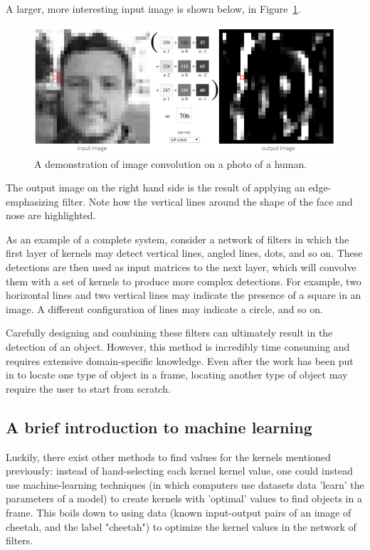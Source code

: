A larger, more interesting input image is shown below, in Figure~\ref{fig:image_kernel_demo}.

\begin{figure}[h!]
  \centering
  \includegraphics[width=\textwidth]{literature_review/image_kernel_demo}
  \caption{\label{fig:image_kernel_demo} A demonstration of image convolution on a photo of a human.}
\end{figure}

The output image on the right hand side is the result of applying an edge-emphasizing filter. Note how the vertical lines around the shape of the face and nose are highlighted.

As an example of a complete system, consider a network of filters in which the first layer of kernels may detect vertical lines, angled lines, dots, and so on. These detections are then used as input matrices to the next layer, which will convolve them with a set of kernels to produce more complex detections. For example, two horizontal lines and two vertical lines may indicate the presence of a square in an image. A different configuration of lines may indicate a circle, and so on.

Carefully designing and combining these filters can ultimately result in the detection of an object. However, this method is incredibly time consuming and requires extensive domain-specific knowledge. Even after the work has been put in to locate one type of object in a frame, locating another type of object may require the user to start from scratch.

\subsection{A brief introduction to machine learning}

Luckily, there exist other methods to find values for the kernels mentioned previously: instead of hand-selecting each kernel kernel value, one could instead use machine-learning techniques (in which computers use datasets data 'learn' the parameters of a model) to create kernels with 'optimal' values to find objects in a frame. This boils down to using data (known input-output pairs of an image of cheetah, and the label "cheetah") to optimize the kernel values in the network of filters.

